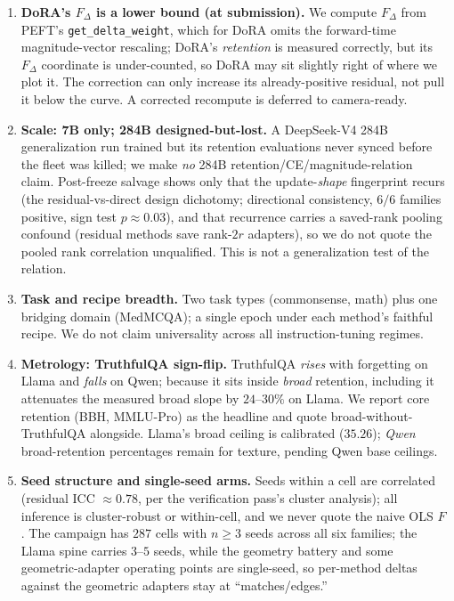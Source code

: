 \documentclass[11pt]{article}
\newcommand{\dw}{F_{\Delta}}
\begin{document}
\begin{enumerate}
        ``lora'', so a pooled ``LoRA'' series reports robustness $10/14$; the
        plain-LoRA subgroup alone is $5/7$. We report $5/7$ and split LoRA-Null as
        its own series throughout; the legend fix is deferred to camera-ready.
  \item \textbf{DoRA's $\dw$ is a lower bound (at submission).} We compute $\dw$
        from PEFT's \texttt{get\_delta\_weight}, which for DoRA omits the
        forward-time magnitude-vector rescaling; DoRA's \emph{retention} is
        measured correctly, but its $\dw$ coordinate is under-counted, so DoRA may
        sit slightly right of where we plot it. The correction can only increase
        its already-positive residual, not pull it below the curve. A corrected
        recompute is deferred to camera-ready.
  \item \textbf{Scale: 7B only; 284B designed-but-lost.} A DeepSeek-V4 284B
        generalization run trained but its retention evaluations never synced
        before the fleet was killed; we make \emph{no} 284B
        retention/CE/magnitude-relation claim. Post-freeze salvage shows only that
        the update-\emph{shape} fingerprint recurs (the residual-vs-direct design
        dichotomy; directional consistency, $6/6$ families positive, sign test
        $p\!\approx\!0.03$), and that recurrence carries a saved-rank pooling
        confound (residual methods save rank-$2r$ adapters), so we do not quote the
        pooled rank correlation unqualified. This is not a generalization test of
        the relation.
  \item \textbf{Task and recipe breadth.} Two task types (commonsense, math) plus
        one bridging domain (MedMCQA); a single epoch under each method's faithful
        recipe. We do not claim universality across all instruction-tuning
        regimes.
  \item \textbf{Metrology: TruthfulQA sign-flip.} TruthfulQA \emph{rises} with
        forgetting on Llama and \emph{falls} on Qwen;
        because it sits inside \emph{broad} retention, including it attenuates the
        measured broad slope by $24$--$30\%$ on Llama. We
        report core retention (BBH, MMLU-Pro) as the headline and quote
        broad-without-TruthfulQA alongside. Llama's broad ceiling is calibrated
        ($35.26$); \emph{Qwen} broad-retention percentages remain for texture,
        pending Qwen base ceilings.
  \item \textbf{Seed structure and single-seed arms.} Seeds within a cell are
        correlated (residual ICC $\approx\!0.78$, per the verification pass's
        cluster analysis); all inference is cluster-robust or within-cell, and we
        never quote the naive OLS $F$. The campaign has $287$ cells with
        $n\!\ge\!3$ seeds across all six families; the Llama spine carries $3$--$5$
        seeds, while the geometry battery and some geometric-adapter operating
        points are single-seed, so per-method deltas against the geometric adapters
        stay at ``matches/edges.''
\end{enumerate}
\end{document}
